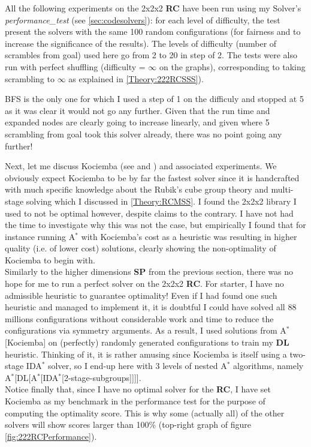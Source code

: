 All the following experiments on the 2x2x2 \textbf{RC} have been run using my Solver's \textit{performance\_test} (see \ref{sec:codesolvers}): for each level of difficulty, the test present the solvers with the same 100 random configurations (for fairness and to increase the significance of the results). The levels of difficulty (number of scrambles from goal) used here go from 2 to 20 in step of 2. The tests were also run with perfect shuffling (difficulty = $\infty$ on the graphs), corresponding to taking scrambling to $\infty$ as explained in \ref{Theory:222RCSSS}).

BFS is the only one for which I used a step of 1 on the difficuly and stopped at 5 as it was clear it would not go any further. Given that the run time and expanded nodes are clearly going to increase linearly, and given where 5 scrambling from goal took this solver already, there was no point going any further!

Next, let me discuss Kociemba (see \cite{HKociemba} and \cite{Kociemba}) and associated experiments. We obviously expect Kociemba to be by far the fastest solver since it is handcrafted with much specific knowledge about the Rubik's cube group theory and multi-stage solving which I discussed in \ref{Theory:RCMSS}. I found the 2x2x2 library I used to not be optimal however, despite claims to the contrary. I have not had the time to investigate why this was not the case, but empirically I found that for instance running A$^{*}$ with Kociemba's cost as a heuristic was resulting in higher quality (i.e. of lower cost) solutions, clearly showing the non-optimality of Kociemba to begin with.
\\
\noindent Similarly to the higher dimensions \textbf{SP} from the previous section, there was no hope for me to run a perfect solver on the 2x2x2 \textbf{RC}. For starter, I have no admissible heuristic to guarantee optimality! Even if I had found one such heuristic and managed to implement it, it is doubtful I could have solved all 88 millions configurations without considerable work and time to reduce the configurations via symmetry arguments. As a result, I used solutions from A$^{*}$[Kociemba] on (perfectly) randomly generated configurations to train my \textbf{DL} heuristic. Thinking of it, it is rather amusing since Kociemba is itself using a two-stage IDA$^{*}$ solver, so I end-up here with 3 levels of nested A$^{*}$ algorithms, namely A$^{*}$[DL[A$^{*}$[IDA$^{*}$[2-stage-subgroups]]]].
\\
Notice finally that, since I have no optimal solver for the \textbf{RC}, I have set Kociemba as my benchmark in the performance test for the purpose of computing the optimality score. This is why some (actually all) of the other solvers will show scores larger than 100\% (top-right graph of figure \ref{fig:222RCPerformance}).






